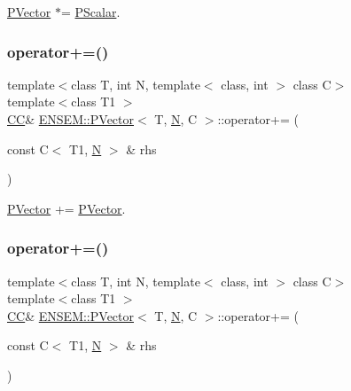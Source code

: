 \mbox{\hyperlink{classENSEM_1_1PVector}{P\+Vector}} $\ast$= \mbox{\hyperlink{classENSEM_1_1PScalar}{P\+Scalar}}. 

\mbox{\label{classENSEM_1_1PVector_a39e015a8751290105c2960d1607c1ce8}} 
\subsubsection{\texorpdfstring{operator+=()}{operator+=()}\hspace{0.1cm}{\footnotesize\ttfamily [1/2]}}
{\footnotesize\ttfamily template$<$class T, int N, template$<$ class, int $>$ class C$>$ \\
template$<$class T1 $>$ \\
\mbox{\hyperlink{classENSEM_1_1PVector_a92dc0a0a301a3dc96f7be5d337019bc7}{CC}}\& \mbox{\hyperlink{classENSEM_1_1PVector}{E\+N\+S\+E\+M\+::\+P\+Vector}}$<$ T, \mbox{\hyperlink{operator__name__util_8cc_a7722c8ecbb62d99aee7ce68b1752f337}{N}}, C $>$\+::operator+= (\begin{DoxyParamCaption}\item[{const C$<$ T1, \mbox{\hyperlink{operator__name__util_8cc_a7722c8ecbb62d99aee7ce68b1752f337}{N}} $>$ \&}]{rhs }\end{DoxyParamCaption})\hspace{0.3cm}{\ttfamily [inline]}}



\mbox{\hyperlink{classENSEM_1_1PVector}{P\+Vector}} += \mbox{\hyperlink{classENSEM_1_1PVector}{P\+Vector}}. 

\mbox{\label{classENSEM_1_1PVector_a39e015a8751290105c2960d1607c1ce8}} 
\subsubsection{\texorpdfstring{operator+=()}{operator+=()}\hspace{0.1cm}{\footnotesize\ttfamily [2/2]}}
{\footnotesize\ttfamily template$<$class T, int N, template$<$ class, int $>$ class C$>$ \\
template$<$class T1 $>$ \\
\mbox{\hyperlink{classENSEM_1_1PVector_a92dc0a0a301a3dc96f7be5d337019bc7}{CC}}\& \mbox{\hyperlink{classENSEM_1_1PVector}{E\+N\+S\+E\+M\+::\+P\+Vector}}$<$ T, \mbox{\hyperlink{operator__name__util_8cc_a7722c8ecbb62d99aee7ce68b1752f337}{N}}, C $>$\+::operator+= (\begin{DoxyParamCaption}\item[{const C$<$ T1, \mbox{\hyperlink{operator__name__util_8cc_a7722c8ecbb62d99aee7ce68b1752f337}{N}} $>$ \&}]{rhs }\end{DoxyParamCaption})\hspace{0.3cm}{\ttfamily [inline]}}



